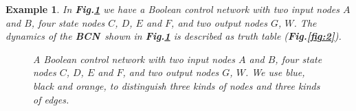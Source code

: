 \documentclass[letterpaper, 10 pt, conference]{ieeeconf}  %
\newtheorem{example}{Example}
\def \BCN {{\bf BCN}}
\begin{document}

\begin{example}
	In {\bf Fig.\ref{fig:1}} we have a Boolean control network with two input nodes $A$ and $B$, four state nodes $C$, $D$, $E$ and $F$, and two output nodes $G$, $W$. The dynamics of the \BCN\ shown in {\bf Fig.\ref{fig:1}} is described as truth table ({\bf Fig.\ref{fig:2}}).
 
  
 \begin{figure}[thpb]
 	\centering
 	
 	\caption{A Boolean control network with two input nodes $A$ and $B$, four state nodes $C$, $D$, $E$ and $F$, and two output nodes $G$, $W$. We use blue, black and orange, to distinguish three kinds of nodes and three kinds of edges.}
 	\label{fig:1}
 \end{figure}
 

\end{example}
\end{document}
